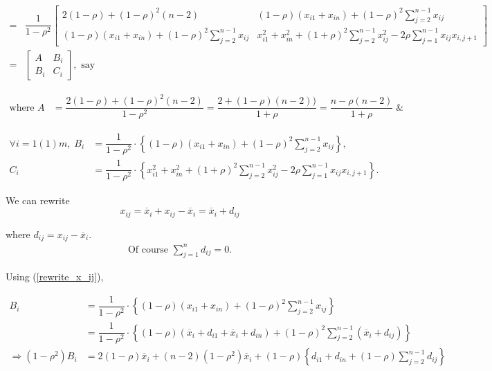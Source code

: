 \documentclass[11pt, a4paper]{article}
\begin{document}
\begin{itemize}
\begin{align*}
=
&
\dfrac{1}{1-\rho^2}
\begin{bmatrix}
2(1-\rho) + (1-\rho)^2(n-2) & (1-\rho)(x_{i1} + x_{in}) + (1-\rho)^2 \sum \limits_{j = 2}^{n-1} x_{ij} \\[1em]
(1-\rho)(x_{i1} + x_{in}) + (1-\rho)^2 \sum \limits_{j = 2}^{n-1} x_{ij} & x_{i1}^2 + x_{in}^2 + (1+\rho)^2 \sum \limits_{j = 2}^{n-1} x_{ij}^2 - 2\rho \sum \limits_{j = 1}^{n-1}x_{ij}x_{i,j+1}
\end{bmatrix}
\\[1em]
=
&
\begin{bmatrix}
A & B_i \\[1em]
B_i & C_i
\end{bmatrix}, \text{ say}
\end{align*}

\begin{align}\label{A}
\text{where } A &= \dfrac{2(1-\rho) + (1-\rho)^2(n-2)}{1 - \rho^2} = \dfrac{2 + (1 - \rho) (n - 2))}{1 + \rho} = \dfrac{n - \rho (n-2)}{1 + \rho} \; \&
\end{align}

\begin{align}
\forall i = 1(1)m, \; B_i &= \dfrac{1}{1 - \rho^2} \cdot \left\{(1-\rho)(x_{i1} + x_{in}) + (1-\rho)^2 \sum \limits_{j = 2}^{n-1} x_{ij} \right\}, \nonumber \\[1em]
C_i &= \dfrac{1}{1 - \rho^2} \cdot \left\{x_{i1}^2 + x_{in}^2 + (1+\rho)^2 \sum \limits_{j = 2}^{n-1} x_{ij}^2 - 2\rho \sum \limits_{j = 1}^{n-1} x_{ij} x_{i,j+1}\right\}. \nonumber
\end{align}

\newpage

We can rewrite
\begin{equation}\label{rewrite_x_ij}
x_{ij} = \overline{x}_i + x_{ij} - \overline{x}_i = \overline{x}_i + d_{ij}
\end{equation}

where $d_{ij} = x_{ij} - \overline{x}_i$. \\[1em]


\begin{align}\label{sum_d_ij}
\text{Of course } \sum \limits_{j = 1}^{n} d_{ij} = 0.
\end{align}

Using (\ref{rewrite_x_ij}),

\begin{align*}
B_i &= \dfrac{1}{1 - \rho^2} \cdot \left\{(1-\rho)(x_{i1} + x_{in}) + (1-\rho)^2 \sum \limits_{j = 2}^{n-1} x_{ij} \right\} \\[0.7em]
&= \dfrac{1}{1 - \rho^2} \cdot \left\{(1-\rho)(\overline{x}_i + d_{i1} + \overline{x}_i + d_{in}) + (1-\rho)^2 \sum \limits_{j = 2}^{n-1} (\overline{x}_i + d_{ij}) \right\} \\[0.7em]
\Rightarrow (1 - \rho^2) B_i &= 2 (1 - \rho) \overline{x}_i + (n-2) (1 - \rho^2) \overline{x}_i + (1 - \rho) \left\{ d_{i1} + d_{in} + (1 - \rho) \sum \limits_{j = 2}^{n-1} d_{ij}  \right\}
\end{align*}


\end{itemize}
\end{document}
